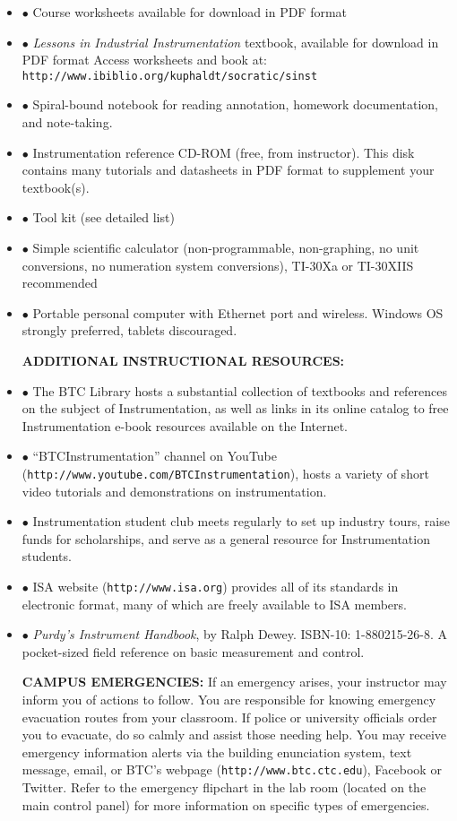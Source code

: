 \begin{itemize}
\item{$\bullet$} Course worksheets available for download in PDF format
\item{$\bullet$} {\it Lessons in Industrial Instrumentation} textbook, available for download in PDF format
\itemitem{$\rightarrow$} Access worksheets and book at: {\tt http://www.ibiblio.org/kuphaldt/socratic/sinst}
\item{$\bullet$} Spiral-bound notebook for reading annotation, homework documentation, and note-taking.
\item{$\bullet$} Instrumentation reference CD-ROM (free, from instructor).  This disk contains many tutorials and datasheets in PDF format to supplement your textbook(s).
\item{$\bullet$} Tool kit (see detailed list)
\item{$\bullet$} Simple scientific calculator (non-programmable, non-graphing, no unit conversions, no numeration system conversions), TI-30Xa or TI-30XIIS recommended
\item{$\bullet$} Portable personal computer with Ethernet port and wireless.  Windows OS strongly preferred, tablets discouraged.

\vskip 10pt

\noindent
{\bf ADDITIONAL INSTRUCTIONAL RESOURCES:} 

\item{$\bullet$} The BTC Library hosts a substantial collection of textbooks and references on the subject of Instrumentation, as well as links in its online catalog to free Instrumentation e-book resources available on the Internet.
\item{$\bullet$} ``BTCInstrumentation'' channel on YouTube ({\tt http://www.youtube.com/BTCInstrumentation}), hosts a variety of short video tutorials and demonstrations on instrumentation.
\item{$\bullet$} Instrumentation student club meets regularly to set up industry tours, raise funds for scholarships, and serve as a general resource for Instrumentation students.
\item{$\bullet$} ISA website ({\tt http://www.isa.org}) provides all of its standards in electronic format, many of which are freely available to ISA members.
\item{$\bullet$} {\it Purdy's Instrument Handbook}, by Ralph Dewey.  ISBN-10: 1-880215-26-8.  A pocket-sized field reference on basic measurement and control.

\vskip 10pt

\noindent
{\bf CAMPUS EMERGENCIES:} If an emergency arises, your instructor may inform you of actions to follow.  You are responsible for knowing emergency evacuation routes from your classroom.  If police or university officials order you to evacuate, do so calmly and assist those needing help.  You may receive emergency information alerts via the building enunciation system, text message, email, or BTC's webpage ({\tt http://www.btc.ctc.edu}), Facebook or Twitter.  Refer to the emergency flipchart in the lab room (located on the main control panel) for more information on specific types of emergencies.


\end{itemize}
